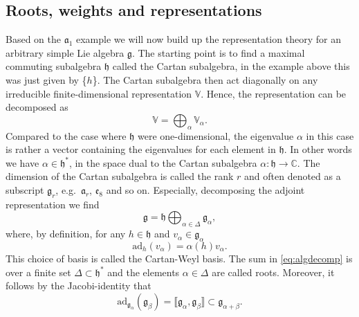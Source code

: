\documentclass[11pt]{report}
\begin{document}
\subsection{Roots, weights and representations}
Based on the $\mathfrak{a}_1$ example we will now build up the representation theory for an arbitrary simple Lie algebra $\mathfrak{g}$. The starting point is to find a maximal commuting subalgebra $\mathfrak{h}$ called the Cartan subalgebra, in the example above this was just given by \{$h$\}. The Cartan subalgebra then act diagonally on any irreducible finite-dimensional representation $\mathbb{V}$. Hence, the representation can be decomposed as 
\begin{equation}
    \mathbb{V} = \bigoplus_\alpha \mathbb{V}_\alpha.
\end{equation}
Compared to the case where $\mathfrak{h}$ were one-dimensional, the eigenvalue $\alpha$ in this case is rather a vector containing the eigenvalues for each element in $\mathfrak{h}$. In other words we have $\alpha\in \mathfrak{h}^*$, in the space dual to the Cartan subalgebra $\alpha:\mathfrak{h}\to \mathbb{C}$. The dimension of the Cartan subalgebra is called the rank $r$ and often denoted as a subscript $\mathfrak{g}_r$, e.g.\ $\mathfrak{a}_r$, $\mathfrak{e}_8$ and so on. Especially, decomposing the adjoint representation we find
\begin{equation}\label{eq:algdecomp}
    \mathfrak{g} = \mathfrak{h}\bigoplus_{\alpha\in\Delta} \mathfrak{g}_\alpha,
\end{equation}
where, by definition, for any $h\in\mathfrak{h}$ and $v_\alpha\in\mathfrak{g}_\alpha$ 
\begin{equation}
    \text{ad}_h(v_\alpha) = \alpha(h)v_\alpha.
\end{equation}
This choice of basis is called the Cartan-Weyl basis. The sum in \eqref{eq:algdecomp} is over a finite set $\Delta\subset\mathfrak{h}^*$ and the elements $\alpha\in\Delta$ are called roots. Moreover, it follows by the Jacobi-identity that 
\begin{equation}
    \text{ad}_{\mathfrak{g}_\alpha}(\mathfrak{g}_\beta) = \llbracket\mathfrak{g}_\alpha,\mathfrak{g}_\beta\rrbracket \subset \mathfrak{g}_{\alpha+\beta}.
\end{equation}
\end{document}
